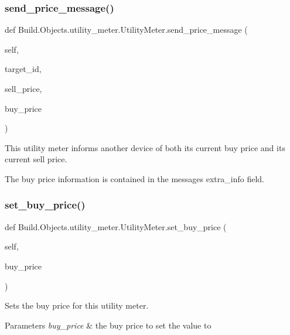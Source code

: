 \subsubsection{\texorpdfstring{send\+\_\+price\+\_\+message()}{send\_price\_message()}}
{\footnotesize\ttfamily def Build.\+Objects.\+utility\+\_\+meter.\+Utility\+Meter.\+send\+\_\+price\+\_\+message (\begin{DoxyParamCaption}\item[{}]{self,  }\item[{}]{target\+\_\+id,  }\item[{}]{sell\+\_\+price,  }\item[{}]{buy\+\_\+price }\end{DoxyParamCaption})}



This utility meter informs another device of both its current buy price and its current sell price. 

The buy price information is contained in the message\textquotesingle{}s extra\+\_\+info field. \mbox{\label{class_build_1_1_objects_1_1utility__meter_1_1_utility_meter_a251bb69419a9885a8e867d8b5932c044}} 
\subsubsection{\texorpdfstring{set\+\_\+buy\+\_\+price()}{set\_buy\_price()}}
{\footnotesize\ttfamily def Build.\+Objects.\+utility\+\_\+meter.\+Utility\+Meter.\+set\+\_\+buy\+\_\+price (\begin{DoxyParamCaption}\item[{}]{self,  }\item[{}]{buy\+\_\+price }\end{DoxyParamCaption})}



Sets the buy price for this utility meter. 


\begin{DoxyParams}{Parameters}
{\em buy\+\_\+price} & the buy price to set the value to \\
\hline
\end{DoxyParams}
\mbox{\label{class_build_1_1_objects_1_1utility__meter_1_1_utility_meter_a3fddd94d0a6ca8646c64a5684e447e0d}} 
